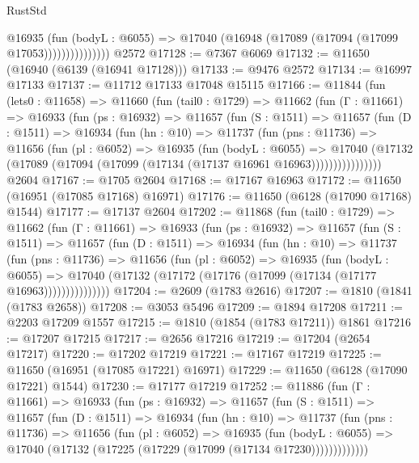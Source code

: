\begin{lexlean}{RustStd}
\begin{coremodule}
                      @16935
                        (fun (bodyL : @6055) =>
                        @17040 (@16948 (@17089 (@17094 (@17099 @17053)))))))))))))))
    @2572
@17128 := @7367 @6069
@17132 := @11650 (@16940 (@6139 (@16941 @17128)))
@17133 := @9476 @2572
@17134 := @16997 @17133
@17137 := @11712 @17133 @17048 @15115
@17166 := @11844
    (fun (lets0 : @11658) =>
    @11660
      (fun (tail0 : @1729) =>
      @11662
        (fun (Γ : @11661) =>
        @16933
          (fun (ps : @16932) =>
          @11657
            (fun (S : @1511) =>
            @11657
              (fun (D : @1511) =>
              @16934
                (fun (hn : @10) =>
                @11737
                  (fun (pns : @11736) =>
                  @11656
                    (fun (pl : @6052) =>
                    @16935
                      (fun (bodyL : @6055) =>
                      @17040
                        (@17132
                          (@17089 (@17094 (@17099 (@17134 (@17137 @16961 @16963))))))))))))))))
    @2604
@17167 := @1705 @2604
@17168 := @17167 @16963
@17172 := @11650 (@16951 (@17085 @17168) @16971)
@17176 := @11650 (@6128 (@17090 @17168) @1544)
@17177 := @17137 @2604
@17202 := @11868
    (fun (tail0 : @1729) =>
    @11662
      (fun (Γ : @11661) =>
      @16933
        (fun (ps : @16932) =>
        @11657
          (fun (S : @1511) =>
          @11657
            (fun (D : @1511) =>
            @16934
              (fun (hn : @10) =>
              @11737
                (fun (pns : @11736) =>
                @11656
                  (fun (pl : @6052) =>
                  @16935
                    (fun (bodyL : @6055) =>
                    @17040 (@17132 (@17172 (@17176 (@17099 (@17134 (@17177 @16963)))))))))))))))
@17204 := @2609 (@1783 @2616)
@17207 := @1810 (@1841 (@1783 @2658))
@17208 := @3053 @5496
@17209 := @1894 @17208
@17211 := @2203 @17209 @1557
@17215 := @1810 (@1854 (@1783 @17211)) @1861
@17216 := @17207 @17215
@17217 := @2656 @17216
@17219 := @17204 (@2654 @17217)
@17220 := @17202 @17219
@17221 := @17167 @17219
@17225 := @11650 (@16951 (@17085 @17221) @16971)
@17229 := @11650 (@6128 (@17090 @17221) @1544)
@17230 := @17177 @17219
@17252 := @11886
    (fun (Γ : @11661) =>
    @16933
      (fun (ps : @16932) =>
      @11657
        (fun (S : @1511) =>
        @11657
          (fun (D : @1511) =>
          @16934
            (fun (hn : @10) =>
            @11737
              (fun (pns : @11736) =>
              @11656
                (fun (pl : @6052) =>
                @16935
                  (fun (bodyL : @6055) =>
                  @17040 (@17132 (@17225 (@17229 (@17099 (@17134 @17230)))))))))))))

\end{coremodule}
\end{lexlean}
